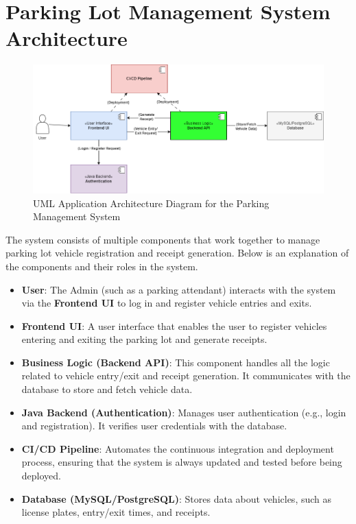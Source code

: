 \section{Parking Lot Management System Architecture}

\begin{figure}[h!]
    \centering
    \includegraphics[width=1\textwidth]{Parking_Management_System_Architecture.png} %
    \caption{UML Application Architecture Diagram for the Parking Management System}
    \label{fig:uml}
\end{figure}

The system consists of multiple components that work together to manage parking lot vehicle registration and receipt generation. Below is an explanation of the components and their roles in the system.

\begin{itemize}
    \item \textbf{User}: The Admin (such as a parking attendant) interacts with the system via the \textbf{Frontend UI} to log in and register vehicle entries and exits.
    \item \textbf{Frontend UI}: A user interface that enables the user to register vehicles entering and exiting the parking lot and generate receipts.
    \item \textbf{Business Logic (Backend API)}: This component handles all the logic related to vehicle entry/exit and receipt generation. It communicates with the database to store and fetch vehicle data.
    \item \textbf{Java Backend (Authentication)}: Manages user authentication (e.g., login and registration). It verifies user credentials with the database.
    \item \textbf{CI/CD Pipeline}: Automates the continuous integration and deployment process, ensuring that the system is always updated and tested before being deployed.
    \item \textbf{Database (MySQL/PostgreSQL)}: Stores data about vehicles, such as license plates, entry/exit times, and receipts.
\end{itemize}


